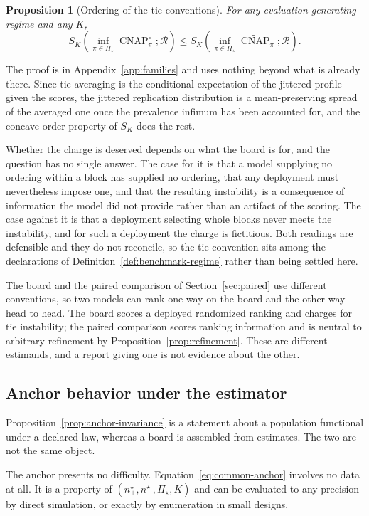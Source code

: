 \documentclass[11pt]{article}
\newcommand{\CNAP}{\operatorname{CNAP}}
\newcommand{\Regime}{\mathcal{R}}
\newcommand{\PSet}{\Pi_\star}
\newcommand{\CNAPta}{\widetilde{\CNAP}}
\newcommand{\CNAPj}{\CNAP^{\circ}}
\newtheorem{proposition}{Proposition}
\theoremstyle{remark}
\begin{document}
\begin{proposition}[Ordering of the tie conventions]
\label{prop:convention-order}
For any evaluation-generating regime and any $K$,
\[
S_K
\left(
\inf_{\pi\in\PSet}\CNAPj_\pi;\Regime
\right)
\leq
S_K
\left(
\inf_{\pi\in\PSet}\CNAPta_\pi;\Regime
\right).
\]
\end{proposition}

The proof is in Appendix~\ref{app:families} and uses nothing beyond what is already there. Since tie averaging is the conditional expectation of the jittered profile given the scores, the jittered replication distribution is a mean-preserving spread of the averaged one once the prevalence infimum has been accounted for, and the concave-order property of $S_K$ does the rest.

Whether the charge is deserved depends on what the board is for, and the question has no single answer. The case for it is that a model supplying no ordering within a block has supplied no ordering, that any deployment must nevertheless impose one, and that the resulting instability is a consequence of information the model did not provide rather than an artifact of the scoring. The case against it is that a deployment selecting whole blocks never meets the instability, and for such a deployment the charge is fictitious. Both readings are defensible and they do not reconcile, so the tie convention sits among the declarations of Definition~\ref{def:benchmark-regime} rather than being settled here.

The board and the paired comparison of Section~\ref{sec:paired} use different conventions, so two models can rank one way on the board and the other way head to head. The board scores a deployed randomized ranking and charges for tie instability; the paired comparison scores ranking information and is neutral to arbitrary refinement by Proposition~\ref{prop:refinement}. These are different estimands, and a report giving one is not evidence about the other.

\subsection{Anchor behavior under the estimator}
\label{sec:anchor-estimation}

Proposition~\ref{prop:anchor-invariance} is a statement about a population functional under a declared law, whereas a board is assembled from estimates. The two are not the same object.

The anchor presents no difficulty. Equation~\eqref{eq:common-anchor} involves no data at all. It is a property of $(n^\star_+,n^\star_-,\PSet,K)$ and can be evaluated to any precision by direct simulation, or exactly by enumeration in small designs.
\end{document}
